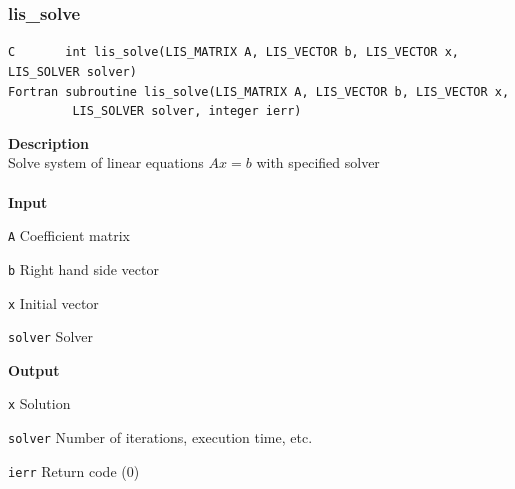 \documentclass[a4paper]{article}
\newcommand{\namelistlabel}[1]{\mbox{#1}\hfill}
\newenvironment{namelist}[1]{%
 \begin{list}{}
  {\let\makelabel\namelistlabel
  \settowidth{\labelwidth}{#1}
  \setlength{\leftmargin}{1.1\labelwidth}}
}{%
\end{list}}
\begin{document}
  \subsubsection{lis\_solve}
\begin{screen}
\verb|C       int lis_solve(LIS_MATRIX A, LIS_VECTOR b, LIS_VECTOR x, LIS_SOLVER solver)|\\
\verb|Fortran subroutine lis_solve(LIS_MATRIX A, LIS_VECTOR b, LIS_VECTOR x,|\\
\verb|         LIS_SOLVER solver, integer ierr)|
\end{screen}
{\bf Description}\\
\indent
Solve system of linear equations $Ax = b$ with specified solver
\\ \\
\noindent
{\bf Input}
\begin{namelist}{XXXXXXXXXXXXXXXXXXXX}
\item[\tt A] Coefficient matrix
\item[\tt b] Right hand side vector
\item[\tt x] Initial vector
\item[\tt solver] Solver
\end{namelist}
{\bf Output}
\begin{namelist}{XXXXXXXXXXXXXXXXXXXX}
\item[\tt x] Solution
\item[\tt solver] Number of iterations, execution time, etc.
\item[\tt ierr] Return code (0)
\end{namelist}
\newpage
\end{document}

